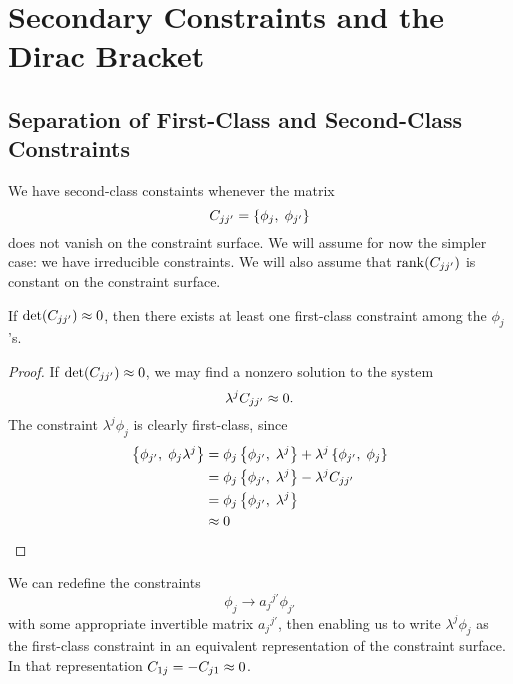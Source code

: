 \section{Secondary Constraints and the Dirac Bracket}

\subsection{Separation of First-Class and Second-Class Constraints}

\M
We have second-class constaints whenever the matrix
\begin{equation}
C_{jj'}=\left\{\phi_{j},\;\phi_{j'}\right\}
\end{equation}
does not vanish on the constraint surface. We will assume for now the
simpler case: we have irreducible constraints. We will also assume that
$\operatorname{rank}(C_{jj'})$ is constant on the constraint surface.

\begin{theorem}
If $\det(C_{jj'})\approx0$, then there exists at least one first-class
constraint among the $\phi_{j}$'s.
\end{theorem}

\begin{proof}
If $\det(C_{jj'})\approx0$, we may find a nonzero solution to the system
\begin{equation}
\lambda^{j}C_{jj'}\approx0.
\end{equation}
The constraint $\lambda^{j}\phi_{j}$ is clearly first-class, since
\begin{subequations}
\begin{align}
\left\{\phi_{j'},\;\phi_{j}\lambda^{j}\right\}
&=\phi_{j}\left\{\phi_{j'},\;\lambda^{j}\right\}+\lambda^{j}\left\{\phi_{j'},\;\phi_{j}\right\}\\
&=\phi_{j}\left\{\phi_{j'},\;\lambda^{j}\right\}-\lambda^{j}C_{jj'}\\
&=\phi_{j}\left\{\phi_{j'},\;\lambda^{j}\right\}\\
&\approx0\tag*{\qedhere}
\end{align}
\end{subequations}
\end{proof}
\M
We can redefine the constraints
\begin{equation}
\phi_{j}\to{a_{j}}^{j'}\phi_{j'}
\end{equation}
with some appropriate invertible matrix ${a_{j}}^{j'}$, then enabling us
to write $\lambda^{j}\phi_{j}$ as the first-class constraint in an
equivalent representation of the constraint surface. In that
representation $C_{1j}=-C_{j1}\approx0$.

